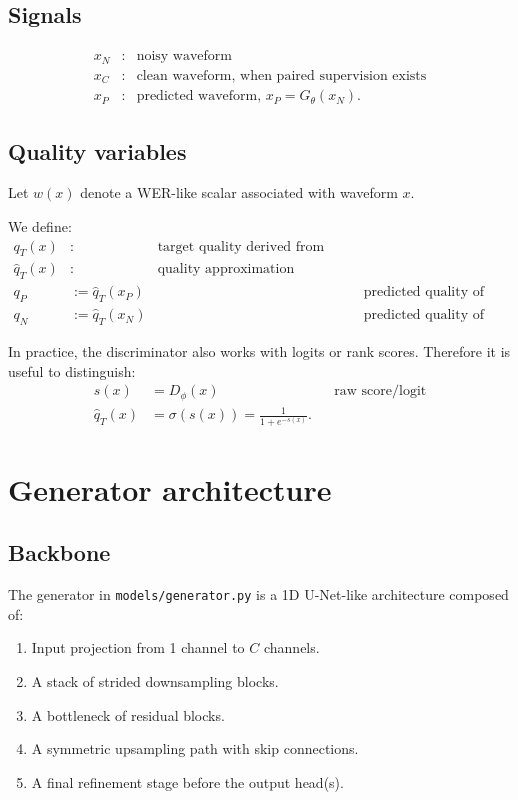\documentclass[11pt]{article}
\begin{document}
\subsection{Signals}
\begin{align}
    x_N &:& \text{noisy waveform} \\
    x_C &:& \text{clean waveform, when paired supervision exists} \\
    x_P &:& \text{predicted waveform, } x_P = G_{\theta}(x_N).
\end{align}

\subsection{Quality variables}
Let $w(x)$ denote a WER-like scalar associated with waveform $x$.

We define:
\begin{align}
    q_T(x) &:& \text{target quality derived from WER or a calibrated transform} \\
    \hat{q}_T(x) &:& \text{quality approximation produced by the discriminator} \\
    q_P &:= \hat{q}_T(x_P) && \text{predicted quality of the enhanced waveform} \\
    q_N &:= \hat{q}_T(x_N) && \text{predicted quality of the noisy waveform.}
\end{align}

In practice, the discriminator also works with logits or rank scores. Therefore it is useful to distinguish:
\begin{align}
    s(x) &= D_{\phi}(x) && \text{raw score/logit} \\
    \hat{q}_T(x) &= \sigma(s(x)) = \frac{1}{1 + e^{-s(x)}}.
\end{align}

\section{Generator architecture}

\subsection{Backbone}
The generator in \texttt{models/generator.py} is a 1D U-Net-like architecture composed of:
\begin{enumerate}[leftmargin=*]
    \item Input projection from 1 channel to $C$ channels.
    \item A stack of strided downsampling blocks.
    \item A bottleneck of residual blocks.
    \item A symmetric upsampling path with skip connections.
    \item A final refinement stage before the output head(s).
\end{enumerate}
\end{document}
